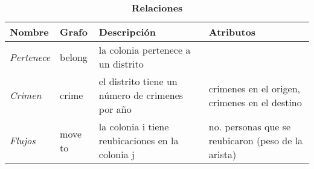 \def\arraystretch{1.5} %
\begin{table}[H]
\centering
\caption{\textbf{Relaciones}}
\footnotesize
\centering
\begin{tabular}{p{1cm} p{1cm} p{2.5cm} p{2.5cm}}
\textbf{Nombre} &  \textbf{Grafo} & \textbf{Descripci\'on} & \textbf{Atributos}\\
\hline
\hline 
\textit{Pertenece} & belong & la colonia pertenece a un distrito & \\
\textit{Crimen} & crime & el distrito tiene un n\'umero de crimenes por año & crimenes en el origen, crimenes en el destino\\
\textit{Flujos} & move to & la colonia i tiene reubicaciones en la colonia j & no. personas que se reubicaron (peso de la arista)
\end{tabular}
\label{tab:t_relaciones}
\end{table}